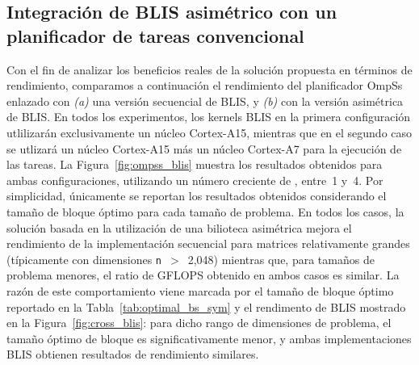 \subsection{Integración de BLIS asimétrico con un planificador de tareas convencional}

Con el fin de analizar los beneficios reales de la solución propuesta en términos de rendimiento, comparamos a continuación
el rendimiento del planificador OmpSs enlazado con {\em (a)} una versión secuencial de BLIS, y {\em (b)} con la versión asimétrica de BLIS. 
En todos los experimentos, los kernels BLIS en la primera configuración utlilizarán exclusivamente un núcleo Cortex-A15, mientras
que en el segundo caso se utlizará un núcleo Cortex-A15 más un núcleo Cortex-A7 para la ejecución de las tareas.
%
La Figura~\ref{fig:ompss_blis} muestra los resultados obtenidos para ambas configuraciones, utilizando un número creciente
de \wts, entre~1 y~4. Por simplicidad, únicamente se reportan los resultados obtenidos considerando el tamaño de bloque óptimo
para cada tamaño de problema. En todos los casos, la solución basada en la utilización de una bilioteca asimétrica mejora
el rendimiento de la implementación secuencial para matrices relativamente grandes (típicamente con dimensiones {\tt n}~$>$~2,048)
mientras que, para tamaños de problema menores, el ratio de GFLOPS obtenido en ambos casos es similar. 
La razón de este comportamiento viene marcada por el tamaño de bloque óptimo reportado en la Tabla~\ref{tab:optimal_bs_sym}
y el rendimento de BLIS mostrado en la Figura~\ref{fig:cross_blis}: para dicho rango de dimensiones de problema,
el tamaño óptimo de bloque es significativamente menor, y ambas implementaciones BLIS obtienen resultados de rendimiento similares.

